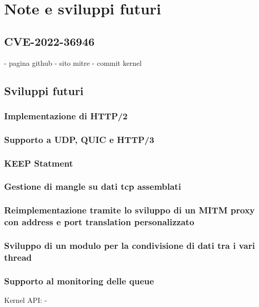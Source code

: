 \chapter{Note e sviluppi futuri}

\section{CVE-2022-36946}

- pagina github
- sito mitre
- commit kernel

\section{Sviluppi futuri}

\subsection{Implementazione di HTTP/2}

\subsection{Supporto a UDP, QUIC e HTTP/3}

\subsection{KEEP Statment}

\subsection{Gestione di mangle su dati tcp assemblati}

\subsection{Reimplementazione tramite lo sviluppo di un MITM proxy con address e port translation personalizzato}

\subsection{Sviluppo di un modulo per la condivisione di dati tra i vari thread}

\subsection{Supporto al monitoring delle queue}

Kernel API:
- 
